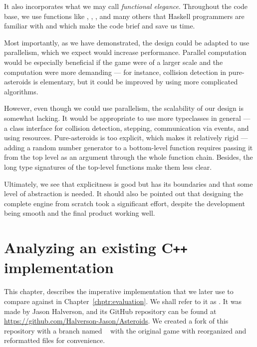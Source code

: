 \documentclass[
  digital, %
  color,   %
  table,   %
  oneside, %
  lof,     %
  lot,     %
]{fithesis3}
\newcommand{\cpp}{C\nolinebreak\texttt{+}\nolinebreak\texttt{+}}
\begin{document}
{It also incorporates what we may call \emph{functional elegance}.
Throughout the code base, we use functions like , ,
,  and many others that Haskell programmers are familiar
with and which make the code brief and save us time.

Most importantly, as we have demonstrated, the design could be adapted to
use parallelism, which we expect would increase performance.
Parallel computation would be especially beneficial if the game were of a larger scale
and the computation were more demanding --- for instance, collision detection
in pure-asteroids is elementary, but it could be improved by using more complicated algorithms.

However, even though we could use parallelism, the scalability of our design is somewhat lacking.
It would be appropriate to use more typeclasses in general --- a class interface for
collision detection, stepping, communication via events, and using resources.
Pure-asteroids is too explicit, which makes it relatively rigid
--- adding a random number generator to a bottom-level
function requires passing it from the top level
as an argument through the whole function chain. Besides, the long type signatures of the
top-level functions make them less clear.

Ultimately, we see that explicitness is good but has its boundaries
and that some level of abstraction is needed. 
It should also be pointed out that designing the complete engine from scratch
took a significant effort, despite the development being smooth and the final
product working well.





\chapter{Analyzing an existing \cpp{} implementation}
\label{chptr:impasteroids}

This chapter, describes the imperative implementation that we later
use to compare against in Chapter~\ref{chptr:evaluation}.
We shall refer to it as .
It was made by Jason Halverson, and its GitHub repository can be found at
\url{https://github.com/Halverson-Jason/Asteroids}. We created a fork of
this repository with a branch named ~\cite{impasteroidsrepo}
with the original game with reorganized and reformatted files for convenience.

}
\end{document}
